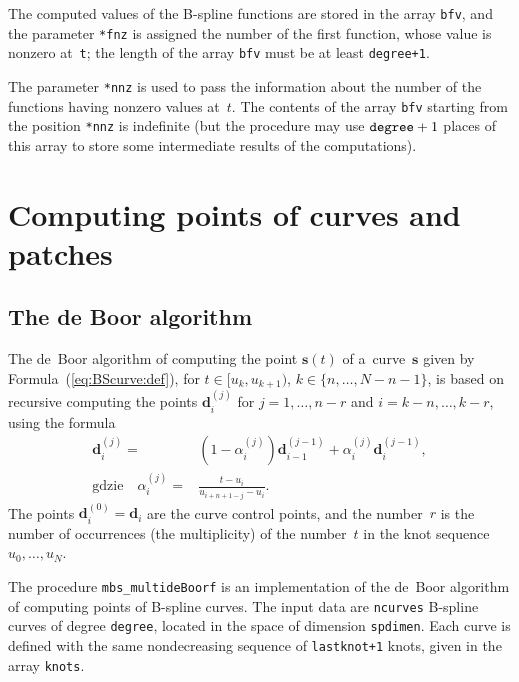 The computed values of the B-spline functions are stored in the array
\texttt{bfv}, and the parameter \texttt{*fnz} is assigned the number of
the first function, whose value is nonzero at~\texttt{t};
the length of the array \texttt{bfv} must be at least \texttt{degree+1}.

The parameter \texttt{*nnz} is used to pass the information about the number
of the functions having nonzero values at~$t$. The contents of the array
\texttt{bfv} starting from the position \texttt{*nnz} is indefinite
(but the procedure may use $\mbox{\texttt{degree}}+1$ places of this array
to store some intermediate results of the computations). 


\newpage
\section{Computing points of curves and patches}

\subsection{The de Boor algorithm}

The de~Boor algorithm of computing the point $\bm{s}(t)$ of a~curve~$\bm{s}$
given by Formula~(\ref{eq:BScurve:def}), for $t\in[u_k,u_{k+1})$,
$k\in\{n,\ldots,N-n-1\}$, is based on recursive computing the points
$\bm{d}^{(j)}_i$ for $j=1,\ldots,n-r$ and $i=k-n,\ldots,k-r$,
using the formula
\begin{align}
  \bm{d}^{(j)}_i ={}&
  (1-\alpha^{(j)}_i)\bm{d}^{(j-1)}_{i-1} + \alpha^{(j)}_i\bm{d}^{(j-1)}_i, \\
  \mbox{gdzie}\quad \alpha^{(j)}_i ={}& \frac{t-u_i}{u_{i+n+1-j}-u_i}. \nonumber
\end{align}
The points $\bm{d}^{(0)}_i=\bm{d}_i$ are the curve control points,
and the number~$r$ is the number of occurrences (the multiplicity)
of the number~$t$ in the knot sequence $u_0,\ldots,u_N$.

\vspace{\bigskipamount}
\begin{sloppypar}
The procedure \texttt{mbs\_multideBoorf} is an implementation
of the de~Boor algorithm of computing points of B-spline curves.
The input data are \texttt{ncurves} B-spline curves of degree \texttt{degree},
located in the space of dimension \texttt{spdimen}. Each curve is defined with
the same nondecreasing sequence of \texttt{lastknot+1} knots,
given in the array \texttt{knots}.
\end{sloppypar}

